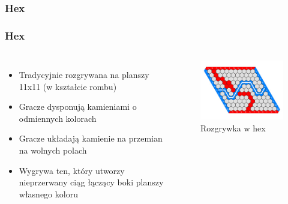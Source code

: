 \documentclass[polish,envcountsect,10pt]{beamer}
\begin{document}
            \subsubsection{Hex}
                \begin{frame}
                    \frametitle{Hex}
                    \begin{columns}
                            \begin{itemize}
                                \item<1-> Tradycyjnie rozgrywana na planszy 11x11 (w kształcie rombu)
                                \item<2-> Gracze dysponują kamieniami o odmiennych kolorach
                                \item<3-> Gracze układają kamienie na przemian na wolnych polach
                                \item<4-> Wygrywa ten, który utworzy nieprzerwany ciąg łączący boki planszy własnego koloru
                            \end{itemize}
                        \begin{figure}[]
                            \centering
                            \includegraphics[width=\textwidth]{images/hex}
                            \caption{Rozgrywka w hex}
                        \end{figure}
                    \end{columns}                    
                \end{frame}
\end{document}
